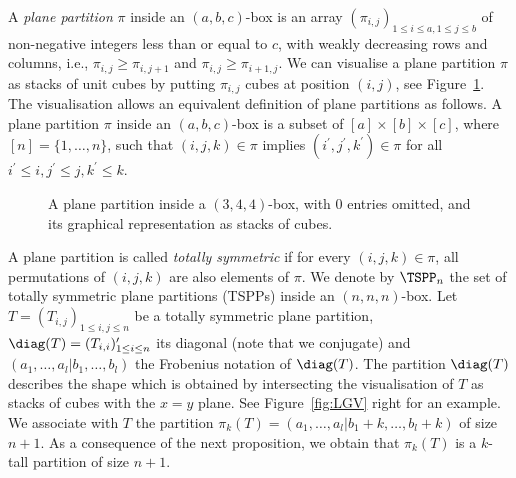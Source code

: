 A \emph{plane partition} $\pi$ inside an $(a,b,c)$-box is an array $(\pi_{i,j})_{1 \leq i \leq a, 1 \leq j \leq b}$ of non-negative integers less than or equal to $c$, with weakly decreasing rows and columns, i.e., $\pi_{i,j} \geq \pi_{i,j+1}$ and  $\pi_{i,j} \geq \pi_{i+1,j}$. We can visualise a plane partition $\pi$ as stacks of unit cubes by putting $\pi_{i,j}$ cubes at position $(i,j)$, see Figure~\ref{fig: ex PP}. The visualisation allows an equivalent definition of plane partitions as follows. A plane partition $\pi$ inside an $(a,b,c)$-box is a subset of $[a]\times[b] \times[c]$, where $[n]=\{1,\ldots,n\}$, such that $(i,j,k) \in \pi$ implies $(i^\prime,j^\prime,k^\prime) \in \pi$ for all $i^\prime \leq i, j^\prime \leq j, k^\prime \leq k$.
\begin{figure}
\begin{center}
\caption{\label{fig: ex PP} A plane partition inside a $(3,4,4)$-box, with $0$ entries omitted, and its graphical representation as stacks of cubes.}
\end{center}
\end{figure}
A plane partition is called \emph{totally symmetric} if for every $(i,j,k) \in \pi$, all permutations of $(i,j,k)$ are also elements of $\pi$. We denote by $\TSPP_n$ the set of totally symmetric plane partitions (TSPPs) inside an $(n,n,n)$-box. Let $T=(T_{i,j})_{1\leq i,j \leq n}$ be a totally symmetric plane partition, $\diag(T)=(T_{i,i})_{1 \leq i \leq n}^\prime$ its diagonal (note that we conjugate) and $(a_1,\ldots,a_l|b_1,\ldots,b_l)$ the Frobenius notation of $\diag(T)$. The partition $\diag(T)$ describes the shape which is obtained by intersecting the visualisation of $T$ as stacks of cubes with the $x=y$ plane. See Figure~\ref{fig:LGV} right for an example. We associate with $T$ the partition $\pi_k(T)=(a_1,\ldots,a_l|b_1+k,\ldots,b_l+k)$ of size $n+1$. As a consequence of the next proposition, we obtain that $\pi_k(T)$ is a $k$-tall partition of size $n+1$.

